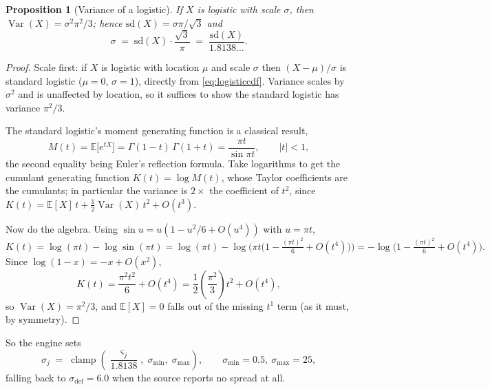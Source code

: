 \documentclass[10pt,a4paper]{article}
\theoremstyle{plain}
\newtheorem{proposition}[theorem]{Proposition}
\theoremstyle{definition}
\theoremstyle{remark}
\begin{document}
\begin{proposition}[Variance of a logistic]
\label{prop:logisticvar}
If $X$ is logistic with scale $\sigma$, then $\operatorname{Var}(X) = \sigma^2\pi^2/3$;
hence $\mathrm{sd}(X) = \sigma\pi/\sqrt{3}$ and
\begin{equation}
\sigma \;=\; \mathrm{sd}(X)\cdot\frac{\sqrt 3}{\pi} \;=\; \frac{\mathrm{sd}(X)}{1.8138\ldots}.
\label{eq:sigmafromstdev}
\end{equation}
\end{proposition}

\begin{proof}
Scale first: if $X$ is logistic with location $\mu$ and scale $\sigma$ then
$(X-\mu)/\sigma$ is standard logistic ($\mu = 0$, $\sigma=1$), directly from
\eqref{eq:logisticcdf}. Variance scales by $\sigma^2$ and is unaffected by location, so it
suffices to show the standard logistic has variance $\pi^2/3$.

The standard logistic's moment generating function is a classical result,
\begin{equation}
M(t) = \mathbb{E}\big[e^{tX}\big] = \Gamma(1-t)\,\Gamma(1+t) = \frac{\pi t}{\sin \pi t},
\qquad |t| < 1,
\label{eq:mgf}
\end{equation}
the second equality being Euler's reflection formula. Take logarithms to get the
cumulant generating function $K(t) = \log M(t)$, whose Taylor coefficients are the
cumulants; in particular the variance is $2\times$ the coefficient of $t^2$, since
$K(t) = \mathbb{E}[X]\,t + \tfrac{1}{2}\operatorname{Var}(X)\,t^2 + O(t^3)$.

Now do the algebra. Using $\sin u = u\left(1 - u^2/6 + O(u^4)\right)$ with $u = \pi t$,
\[
K(t) = \log(\pi t) - \log \sin(\pi t)
     = \log(\pi t) - \log\!\Big(\pi t\big(1 - \tfrac{(\pi t)^2}{6} + O(t^4)\big)\Big)
     = -\log\!\Big(1 - \tfrac{(\pi t)^2}{6} + O(t^4)\Big).
\]
Since $\log(1-x) = -x + O(x^2)$,
\[
K(t) = \frac{\pi^2 t^2}{6} + O(t^4) = \frac{1}{2}\left(\frac{\pi^2}{3}\right)t^2 + O(t^4),
\]
so $\operatorname{Var}(X) = \pi^2/3$, and $\mathbb{E}[X] = 0$ falls out of the missing
$t^1$ term (as it must, by symmetry).
\end{proof}

So the engine sets
\begin{equation}
\sigma_j \;=\; \operatorname{clamp}\!\left(\frac{\varsigma_j}{1.8138},\;
\sigma_{\min},\; \sigma_{\max}\right),
\qquad \sigma_{\min} = 0.5,\ \sigma_{\max} = 25,
\label{eq:sigmaclamp}
\end{equation}
falling back to $\sigma_{\text{def}} = 6.0$ when the source reports no spread at all.
\end{document}
